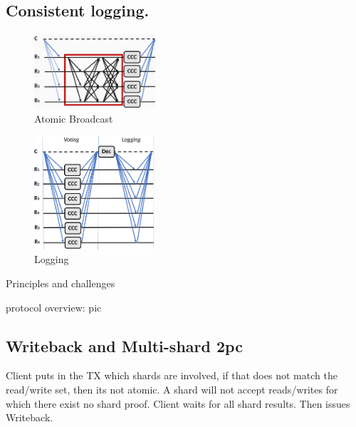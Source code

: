 \subsection{Consistent logging.}
\begin{figure}
\begin{center}
\includegraphics[width= 0.4\textwidth]{./figures/AB.png}
\end{center}
\caption{Atomic Broadcast}
\label{fig:Figure1}
\end{figure}


\begin{figure}
\begin{center}
\includegraphics[width= 0.4\textwidth]{./figures/5f+1.png}
\end{center}
\caption{Logging}
\label{fig:Figure1}
\end{figure}

Principles and challenges

protocol overview: pic


\subsection{Writeback and Multi-shard 2pc}
Client puts in the TX which shards are involved, if that does not match the read/write set, then its not atomic. A shard will not accept reads/writes for which there exist no shard proof.
Client waits for all shard results. Then issues Writeback.
